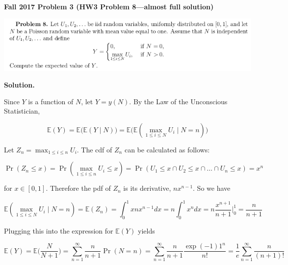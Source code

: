 \documentclass{article}
\newcommand{\E}{\mathbb{E}}
\newcommand{\Var}{\mathrm{Var}}
\begin{document}
\textbf{Fall 2017 Problem 3 (HW3 Problem 8---almost full solution)}

\includegraphics[scale=0.6]{prob_hw3p8}


\textbf{Solution.} 

Since \(Y\) is a function of \(N\), let \(Y = y(N)\). By the Law of the Unconscious Statistician,

\[
\E(Y) = \E \big( \E( Y \mid N) \big) = \E \big( \E( \max_{1 \leq i \leq N} U_i \mid N = n ) \big) 
\]

Let \( Z_n = \max_{1 \leq i \leq n} U_i  \). The cdf of \(Z_n\) can be calculated as follows:

\[
\Pr(Z_n \leq x) = \Pr(  \max_{1 \leq i \leq n} U_i  \leq x) = \Pr(U_1 \leq x \cap U_2 \leq x \cap \ldots \cap U_n \leq x) = x^n
\]

for \(x \in [0, 1]\). Therefore the pdf of \(Z_n\) is its derivative, \(nx^{n-1}\). So we have

\[
 \E( \max_{1 \leq i \leq N} U_i \mid N = n ) = \E(Z_n) = \int_{0}^1 x n x^{n-1} dx = n \int_0^1 x^n dx = n \frac{x^{n+1}}{n+1} \bigg|_0^1 = \frac{n}{n+1}
\]

Plugging this into the expression for \(\E(Y)\) yields

\[
\E(Y) = \E \bigg( \frac{N}{N+1} \bigg) = \sum_{n=1}^\infty \frac{n}{n+1} \Pr(N = n) = \sum_{n=1}^\infty \frac{n}{n+1} \frac{\exp(-1)1^n}{n!} = \boxed{ \frac{1}{e} \sum_{n=1}^\infty \frac{n}{(n+1)!}}
\]


%
%
%
%
\end{document}
